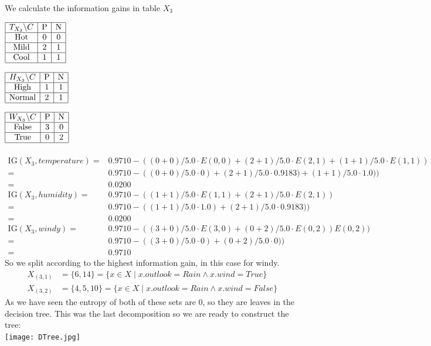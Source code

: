 \documentclass{article}
\theoremstyle{remark}
\begin{document}
	
	
	We calculate the information gains in table $X_3$
	\begin{multicols}{3}
		$\begin{array}{|c|c|c|} \hline
		T_{X_3}\backslash C & \text{P} & \text{N}\\ \hline
		\text{Hot} & 0 & 0\\ \hline
		\text{Mild} & 2 & 1\\\hline
		\text{Cool} & 1 & 1\\\hline
		\end{array}$
		\columnbreak
		
		$\begin{array}{|c|c|c|}\hline
		H_{X_3}\backslash C & \text{P} & \text{N}\\\hline
		\text{High} & 1 & 1\\\hline
		\text{Normal} & 2 & 1\\\hline
		\end{array}$
		\columnbreak
		
		$\begin{array}{|c|c|c|}\hline
		W_{X_3}\backslash C & \text{P} & \text{N}\\\hline
		\text{False} & 3 & 0\\\hline
		\text{True} & 0 & 2 \\\hline
		\end{array}$
	\end{multicols}
	\begin{align*}
	\\\text{IG}(X_3,temperature)=& 0.9710-((0+0)/5.0 \cdot E(0,0)+(2+1)/5.0 \cdot E(2,1)+(1+1)/5.0 \cdot E(1,1))
	\\=& 0.9710-((0+0)/5.0 \cdot 0)+(2+1)/5.0 \cdot 0.9183)+(1+1)/5.0 \cdot 1.0))
	\\=&0.0200
	\\\text{IG}(X_3,humidity)=& 0.9710-((1+1)/5.0 \cdot E(1,1)+(2+1)/5.0 \cdot E(2,1))
	\\=&0.9710-((1+1)/5.0 \cdot 1.0)+(2+1)/5.0 \cdot 0.9183))
	\\=&0.0200
	\\\text{IG}(X_3,windy)=& 0.9710-((3+0)/5.0 \cdot E(3,0)+(0+2)/5.0 \cdot E(0,2)) E(0,2)) 
	\\=&0.9710-((3+0)/5.0 \cdot 0)+(0+2)/5.0 \cdot 0))
	\\=&0.9710
	\end{align*}    
	So we split according to the highest information gain, in this case for windy.\\ %
	\begin{align*}
	X_{(3,1)}&=\{6,14\}=\{x\in X \mid x.outlook = Rain \wedge x.wind = True \} \\X_{(3,2)}&= \{4,5,10\} = \{x\in X \mid x.outlook = Rain \wedge x.wind = False \}
	\end{align*}
	As we have seen the entropy of both of these sets are 0, so they are leaves in the decision tree. This was the last decomposition so we are ready to construct the tree:
	\\\texttt{[image: DTree.jpg]}
\end{document}
